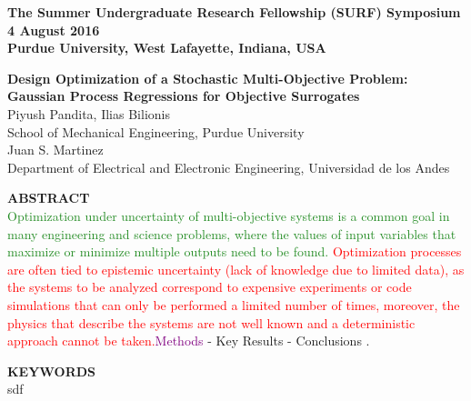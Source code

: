 \documentclass[a4paper]{article}
\begin{document}
{\footnotesize
  \textbf{The Summer Undergraduate Research Fellowship (SURF) Symposium\\
    4 August 2016\\
    Purdue University, West Lafayette, Indiana, USA\\
    }
}
\begin{center}
{\Large \textbf{Design Optimization of a Stochastic Multi-Objective Problem: Gaussian Process Regressions for Objective Surrogates\\}}
{\normalsize Piyush Pandita, Ilias Bilionis\\
School of Mechanical Engineering, Purdue University\\
Juan S. Martinez\\
Department of Electrical and Electronic Engineering, Universidad de los Andes\\
}
\end{center}
{\large \textbf{ABSTRACT}\\}
{\normalsize \textcolor{ForestGreen}{Optimization under uncertainty of multi-objective systems is a common goal in many engineering and science problems, where the values of input variables that maximize or minimize multiple outputs need to be found. }\textcolor{red}{Optimization processes are often tied to epistemic uncertainty (lack of knowledge due to limited data), as the systems to be analyzed correspond to expensive experiments or code simulations that can only be performed a limited number of times, moreover, the physics that describe the systems are not well known and a deterministic approach cannot be taken.}\textcolor{Purple}{Methods} - \textcolor{TealBlue}{Key Results} - Conclusions .\\}

{\large \textbf{KEYWORDS}\\}
{\normalsize sdf}
\end{document}
